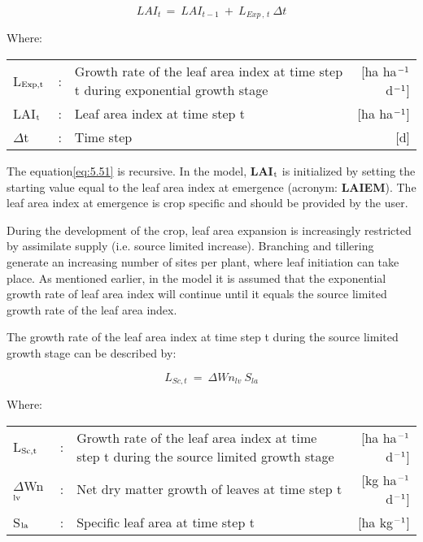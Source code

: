 \begin{equation}
\label{eq:5.51}
LAI _{t~} =~LAI _{t-1} ~+~L _{Exp\, ,\, t} ~\Delta t
\end{equation}

Where:\\[5pt]
\begin{tabularx}{\textwidth}{llXr}
	L$_{{\rm Exp,t}}$ &:& Growth rate of the leaf area index at time step t
	during exponential growth stage    &    [ha ha$^{{\rm -1}}$ d$^{{\rm -1}}$]\\
	LAI$_{{\rm t}}$ &:& Leaf area index at time step t   &
	[ha ha$^{{\rm -1}}$]\\
	$\Delta$t &:& Time step   &    [d]
\end{tabularx}

The equation\ref{eq:5.51} is recursive. In the model, {\bf LAI$_{{\rm t}}$} is initialized by 
setting the starting
value equal to the leaf area index at emergence (acronym: {\bf LAIEM}). The leaf area index
at emergence is crop specific and should be provided by the user.

During the development of the crop, leaf area expansion is increasingly restricted by
assimilate supply (i.e. source limited increase). Branching and tillering generate an
increasing number of sites per plant, where leaf initiation can take place. As mentioned
earlier, in the model it is assumed that the exponential growth rate of leaf area index will
continue until it equals the source limited growth rate of the leaf area index.

The growth rate of the leaf area index at time step t during the source limited growth 
stage can be described by:

\begin{equation}
\label{eq:5.52}
L _{Sc,t} ~=~\Delta Wn _{lv} ~S _{la} 
\end{equation}

Where:\\[5pt]
\begin{tabularx}{\textwidth}{llXr}
	L$_{{\rm Sc,t}}$ &:& Growth rate of the leaf area index at time step t
	during the source limited growth stage    &
	[ha ha$^{{\rm -1}}$ d$^{{\rm -1}}$]\\
	$\Delta$Wn$_{{\rm lv}}$ &:& Net dry matter growth of leaves at time step t    &
	[kg ha$^{{\rm -1}}$ d$^{{\rm -1}}$]\\
	S$_{{\rm la}}$ &:& Specific leaf area at time step t   &
	[ha kg$^{{\rm -1}}$]\\
\end{tabularx}

